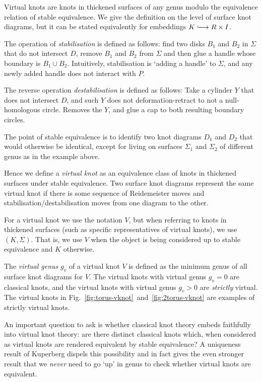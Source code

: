 \documentclass[12pt]{report}
\newcommand{\inject}{\lhook\joinrel\longrightarrow}
\theoremstyle{upright}
\begin{document}
Virtual knots are knots in thickened surfaces of any genus modulo the equivalence relation of stable equivalence. We give the definition on the level of surface knot diagrams, but it can be stated equivalently for embeddings $K \inject R \times I$.

The operation of \textit{stabilisation} is defined as follows: find two disks $B_{1}$ and $B_{2}$ in $\Sigma$ that do not intersect $D$, remove $B_{1}$ and $B_{2}$ from $\Sigma$ and then glue a handle whose boundary is $B_{1} \cup B_{2}$. Intuitively, stabilisation is `adding a handle' to $\Sigma$, and any newly added handle does not interact with $P$.

The reverse operation \textit{destabilisation} is defined as follows: Take a cylinder $Y$ that does not intersect $D$, and such $Y$ does not deformation-retract to not a null-homologous circle. Removes the $Y$, and glue a cap to both resulting boundary circles.

The point of stable equivalence is to identify two knot diagrams $D_{1}$ and $D_{2}$ that would otherwise be identical, except for living on surfaces $\Sigma_{1}$ and $\Sigma_{2}$ of different genus as in the example above.

Hence we define a \textit{virtual knot} as an equivalence class of knots in thickened surfaces under stable equivalence. Two surface knot diagrams represent the same virtual knot if there is some sequence of Reidemeister moves and stabilisation/destabilisation moves from one diagram to the other.

For a virtual knot we use the notation $V$, but when referring to knots in thickened surfaces (such as specific representatives of virtual knots), we use $(K, \Sigma)$. That is, we use $V$ when the object is being considered up to stable equivalence and $K$ otherwise.

The \textit{virtual genus} $g_{v}$ of a virtual knot $V$ is defined as the minimum genus of all surface knot diagrams for $V$. The virtual knots with virtual genus $g_{v} = 0$ are classical knots, and the virtual knots with virtual genus $g_{v} > 0$ are \textit{strictly} virtual. The virtual knots in Fig.~\ref{fig:torus-vknot}~and~\ref{fig:2torus-vknot} are examples of strictly virtual knots.

An important question to ask is whether classical knot theory embeds faithfully into virtual knot theory: are there distinct classical knots which, when considered as virtual knots are rendered equivalent by stable equivalence? A uniqueness result of Kuperberg dispels this possibility and in fact gives the even stronger result that we \textit{never} need to go `up' in genus to check whether virtual knots are equivalent.
\end{document}
